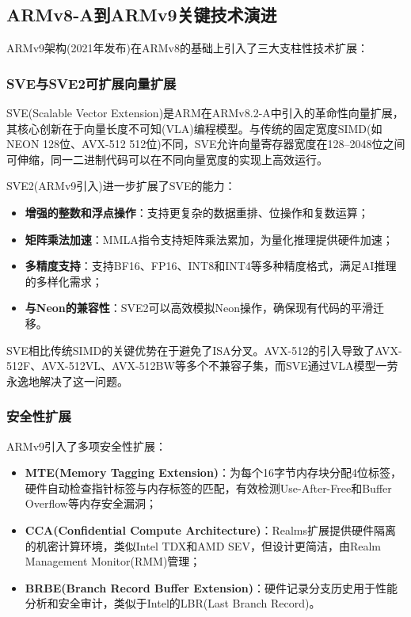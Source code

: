 \documentclass[12pt,a4paper]{IEEEtran}
\begin{document}
\subsection{ARMv8-A到ARMv9关键技术演进}

ARMv9架构(2021年发布)在ARMv8的基础上引入了三大支柱性技术扩展\cite{arm2021armv9}：

\subsubsection{SVE与SVE2可扩展向量扩展}

SVE(Scalable Vector Extension)是ARM在ARMv8.2-A中引入的革命性向量扩展，其核心创新在于向量长度不可知(VLA)编程模型\cite{stephens2017sve}。与传统的固定宽度SIMD(如NEON 128位、AVX-512 512位)不同，SVE允许向量寄存器宽度在128--2048位之间可伸缩，同一二进制代码可以在不同向量宽度的实现上高效运行。

SVE2(ARMv9引入)进一步扩展了SVE的能力：
\begin{itemize}
\item \textbf{增强的整数和浮点操作}：支持更复杂的数据重排、位操作和复数运算；
\item \textbf{矩阵乘法加速}：MMLA指令支持矩阵乘法累加，为量化推理提供硬件加速；
\item \textbf{多精度支持}：支持BF16、FP16、INT8和INT4等多种精度格式，满足AI推理的多样化需求；
\item \textbf{与Neon的兼容性}：SVE2可以高效模拟Neon操作，确保现有代码的平滑迁移。
\end{itemize}

SVE相比传统SIMD的关键优势在于避免了ISA分叉。AVX-512的引入导致了AVX-512F、AVX-512VL、AVX-512BW等多个不兼容子集，而SVE通过VLA模型一劳永逸地解决了这一问题。

\subsubsection{安全性扩展}

ARMv9引入了多项安全性扩展：
\begin{itemize}
\item \textbf{MTE(Memory Tagging Extension)}：为每个16字节内存块分配4位标签，硬件自动检查指针标签与内存标签的匹配，有效检测Use-After-Free和Buffer Overflow等内存安全漏洞\cite{serebryany2019mte}；
\item \textbf{CCA(Confidential Compute Architecture)}：Realms扩展提供硬件隔离的机密计算环境，类似Intel TDX和AMD SEV，但设计更简洁，由Realm Management Monitor(RMM)管理；
\item \textbf{BRBE(Branch Record Buffer Extension)}：硬件记录分支历史用于性能分析和安全审计，类似于Intel的LBR(Last Branch Record)。
\end{itemize}
\end{document}
